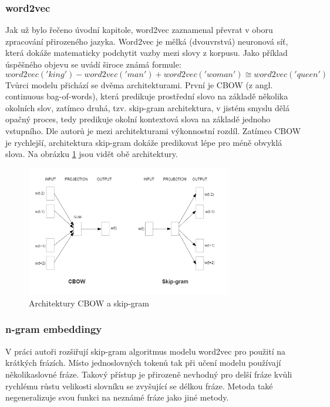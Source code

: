\documentclass[thesis=M,czech]{FITthesis}[2019/12/23]
\begin{document}
\subsubsection{word2vec}
Jak už bylo řečeno úvodní kapitole, word2vec\cite{mikolov2013} zaznamenal převrat v oboru zpracování přirozeného jazyka. Word2vec je mělká (dvouvrstvá) neuronová síť, která dokáže matematicky podchytit vazby mezi slovy z korpusu. Jako příklad úspěšného objevu se uvádí široce známá formule:
\begin{equation}
word2vec('king' ) - word2vec('man' ) + word2vec('woman' ) \cong word2vec('queen')
\end{equation}
Tvůrci modelu přichází se dvěma architekturami. První je CBOW (z angl. continuous bag-of-words), která predikuje prostřední slovo na základě několika okolních slov, zatímco druhá, tzv. skip-gram architektura, v jistém smyslu dělá opačný proces, tedy predikuje okolní kontextová slova na základě jednoho vstupního. Dle autorů je mezi architekturami výkonnostní rozdíl. Zatímco CBOW je rychlejší, architektura skip-gram dokáže predikovat lépe pro méně obvyklá slova\cite{mikolov2013}.
 Na obrázku \ref{fig:mikolov2013word2vec} jsou vidět obě architektury.
\begin{figure}\centering
	\includegraphics[width=0.8\textwidth]{images/mikolov2013_word2vec.png}
	\caption{Architektury CBOW a skip-gram\cite{mikolov2013}}\label{fig:mikolov2013word2vec}
\end{figure}

\subsubsection{n-gram embeddingy}
V práci \cite{mikolov2013b} autoři rozšiřují skip-gram algoritmus modelu word2vec pro použití na krátkých frázích. Místo jednoslovných tokenů tak při učení modelu používají několikaslovné fráze. Takový přístup je přirozeně nevhodný pro delší fráze kvůli rychlému růstu velikosti slovníku se zvyšující se délkou fráze. Metoda také negeneralizuje svou funkci na neznámé fráze jako jiné metody.
\end{document}
